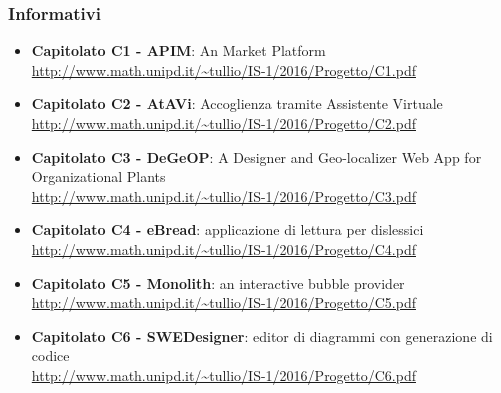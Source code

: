 \subsubsection{Informativi}
\begin{itemize}
	\item \textbf{Capitolato C1 - APIM}: An  Market Platform\\ \url{http://www.math.unipd.it/~tullio/IS-1/2016/Progetto/C1.pdf}
	\item \textbf{Capitolato C2 - AtAVi}: Accoglienza tramite Assistente Virtuale\\
	\url{http://www.math.unipd.it/~tullio/IS-1/2016/Progetto/C2.pdf}
	\item \textbf{Capitolato C3 - DeGeOP}: A Designer and Geo-localizer Web App for Organizational Plants\\ \url{http://www.math.unipd.it/~tullio/IS-1/2016/Progetto/C3.pdf}
	\item \textbf{Capitolato C4 - eBread}: applicazione di lettura per dislessici\\
	\url{http://www.math.unipd.it/~tullio/IS-1/2016/Progetto/C4.pdf}
	\item \textbf{Capitolato C5 - Monolith}: an interactive bubble provider\\ \url{http://www.math.unipd.it/~tullio/IS-1/2016/Progetto/C5.pdf}
	\item \textbf{Capitolato C6 - SWEDesigner}: editor di diagrammi  con generazione di codice\\ \url{http://www.math.unipd.it/~tullio/IS-1/2016/Progetto/C6.pdf}
\end{itemize}
